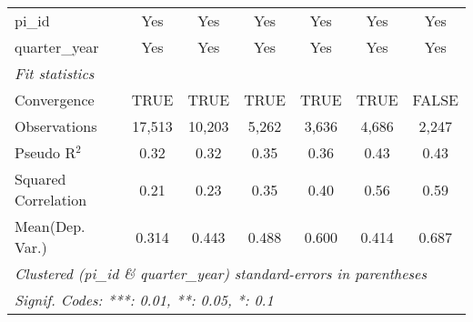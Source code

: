 \begin{tabular}{lcccccc}
   pi\_id                                                     & Yes           & Yes           & Yes           & Yes           & Yes            & Yes\\  
   quarter\_year                                              & Yes           & Yes           & Yes           & Yes           & Yes            & Yes\\  
   \midrule
   \emph{Fit statistics}\\
   Convergence                                                &TRUE           & TRUE          & TRUE          & TRUE          & TRUE           & FALSE\\  
   Observations                                               & 17,513        & 10,203        & 5,262         & 3,636         & 4,686          & 2,247\\  
   Pseudo R$^2$                                               & 0.32          & 0.32          & 0.35          & 0.36          & 0.43           & 0.43\\  
   Squared Correlation                                        & 0.21          & 0.23          & 0.35          & 0.40          & 0.56           & 0.59\\  
Mean(Dep. Var.) & 0.314 & 0.443 & 0.488 & 0.600 & 0.414 & 0.687 \\
   \midrule \midrule
   \multicolumn{7}{l}{\emph{Clustered (pi\_id \& quarter\_year) standard-errors in parentheses}}\\
   \multicolumn{7}{l}{\emph{Signif. Codes: ***: 0.01, **: 0.05, *: 0.1}}\\
\end{tabular}
\par\endgroup
